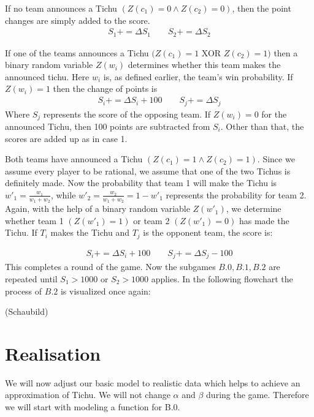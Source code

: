 \begin{axioms}[(C1)]
\item   If no team announces a Tichu $(Z(c_1) = 0 \land Z(c_2) = 0)$, then the point changes are simply added to the score.
\begin{gather*}
S_1 += \Delta S_1 \qquad S_2 += \Delta S_2
\end{gather*}
\item If one of the teams announces a Tichu $(Z(c_1) = 1$ XOR $Z(c_2) = 1)$ then a binary random variable $Z(w_i)$ determines whether this team makes the announced tichu. Here $w_i$ is, as defined earlier, the team's win probability. If $Z(w_i) = 1$ then the change of points is
\begin{gather*}
S_i += \Delta S_i + 100 \qquad S_j += \Delta S_j
\end{gather*}
Where $S_j$ represents the score of the opposing team. If $Z(w_i) = 0$ for the announced Tichu, then 100 points are subtracted from $S_i$. Other than that, the scores are added up as in case 1.
\item Both teams have announced a Tichu $(Z(c_1) = 1 \land Z(c_2) = 1)$. Since we assume every player to be rational, we assume that one of the two Tichus is definitely made. Now the probability that team 1 will make the Tichu is $w'_1 = \frac{w_1}{w_1+w_2}$, while $w'_2 =\frac{w_2}{w_1+w_2} = 1- w'_1$ represents the probability for team 2. Again, with the help of a binary random variable $Z(w'_1)$, we determine whether team 1 $(Z(w'_1) = 1)$ or team 2 $(Z(w'_1) = 0)$ has made the Tichu. If $T_i$ makes the Tichu and $T_j$ is the opponent team, the score is:

\begin{gather*}
S_i += \Delta S_i + 100 \qquad S_j += \Delta S_j - 100
\end{gather*}
This completes a round of the game. Now the subgames $B.0,B.1,B.2$ are repeated until $S_1 > 1000$ or $S_2 > 1000$ applies. In the following flowchart the process of $B.2$ is visualized once again:
\end{axioms}
(Schaubild)
\section{Realisation}
We will now adjust our basic model to realistic data which helps to achieve an approximation of Tichu. We will not change $\alpha$ and $\beta$ during the game. Therefore we will start with modeling a function for B.0.

